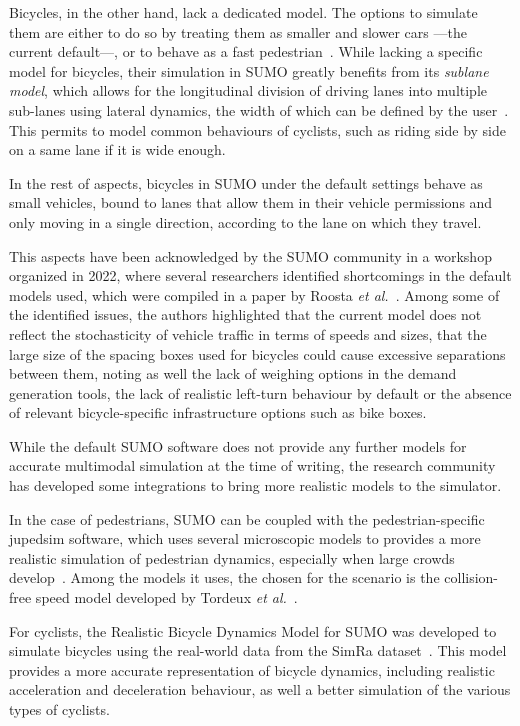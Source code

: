 \medskip

\noindent Bicycles, in the other hand, lack a dedicated model. The options to simulate them are either to do so by treating them as smaller and slower cars —the current default—, or to behave as a fast pedestrian~\cite{Kaths2023}. While lacking a specific model for bicycles, their simulation in SUMO greatly benefits from its \textit{sublane model}, which allows for the longitudinal division of driving lanes into multiple sub-lanes using lateral dynamics, the width of which can be defined by the user~\cite{AlvarezLopez2018}. This permits to model common behaviours of cyclists, such as riding side by side on a same lane if it is wide enough.

In the rest of aspects, bicycles in SUMO under the default settings behave as small vehicles, bound to lanes that allow them in their vehicle permissions and only moving in a single direction, according to the lane on which they travel.

This aspects have been acknowledged by the SUMO community in a workshop organized in 2022, where several researchers identified shortcomings in the default models used, which were compiled in a paper by Roosta \textit{et al.}~\cite{Roosta2023}. Among some of the identified issues, the authors highlighted that the current model does not reflect the stochasticity of vehicle traffic in terms of speeds and sizes, that the large size of the spacing boxes used for bicycles could cause excessive separations between them, noting as well the lack of weighing options in the demand generation tools, the lack of realistic left-turn behaviour by default or the absence of relevant bicycle-specific infrastructure options such as bike boxes.

\medskip

\noindent While the default SUMO software does not provide any further models for accurate multimodal simulation at the time of writing, the research community has developed some integrations to bring more realistic models to the simulator.

In the case of pedestrians, SUMO can be coupled with the pedestrian-specific \gls{jupedsim} software, which uses several microscopic models to provides a more realistic simulation of pedestrian dynamics, especially when large crowds develop~\cite{Chraibi2026}. Among the models it uses, the chosen for the scenario is the collision-free speed model developed by Tordeux \textit{et al.}~\cite{Tordeux2015}.

For cyclists, the Realistic Bicycle Dynamics Model for SUMO was developed to simulate bicycles using the real-world data from the SimRa dataset~\cite{Ostendorf2025}. This model provides a more accurate representation of bicycle dynamics, including realistic acceleration and deceleration behaviour, as well a better simulation of the various types of cyclists.

